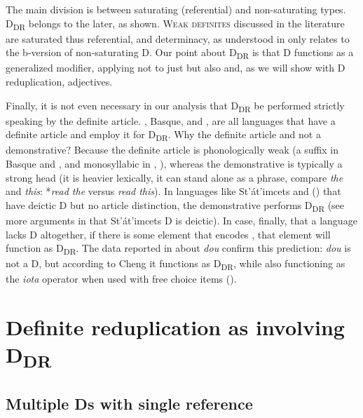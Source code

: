 \documentclass[output=paper,
modfonts
]{langscibook}
\begin{document}
The main division is between saturating (referential) and non-saturating types. D\textsubscript{DR} belongs to the later, as shown. \textsc{Weak definites} discussed in the literature are saturated thus referential, and determinacy, as understood in \citet{CoppockBeaver2015} only relates to the b-version of non-saturating D. Our point about D\textsubscript{DR} is that D functions as a generalized modifier, applying not to just  but also  and, as we will show with D reduplication, adjectives. 

Finally, it is not even necessary in our analysis that D\textsubscript{DR} be performed strictly speaking by the definite article. , Basque,  and , are all languages that have a definite article and employ it for D\textsubscript{DR}. Why the definite article and not a demonstrative? Because the definite article is phonologically weak (a suffix in Basque and , and monosyllabic in , ), whereas the demonstrative is typically a strong head (it is heavier lexically, it can stand alone as a phrase, compare \textit{the} and \textit{this}: *\textit{read the} versus \textit{read this}). In languages like St'\'at'imcets and  (\citealt{kang2015}) that have deictic D but no article distinction, the demonstrative performs D\textsubscript{DR} (see more arguments in \citealt{etxeberria-giannakidou2014} that St'\'at'imcets D is deictic). In case, finally, that a language lacks D altogether, if there is some element that encodes , that element will function as D\textsubscript{DR}. The data reported in \citet{Cheng2009} about  \textit{dou} confirm this prediction: \textit{dou} is not a D, but according to Cheng it functions as D\textsubscript{DR}, while also functioning as the \textit{iota} operator when used with free choice items (\citealt{giannakidou-cheng2006}).


\section{Definite reduplication as involving D\textsubscript{DR}} \label{sec:etxeberria:4}

\subsection{Multiple Ds with single reference}
\end{document}
